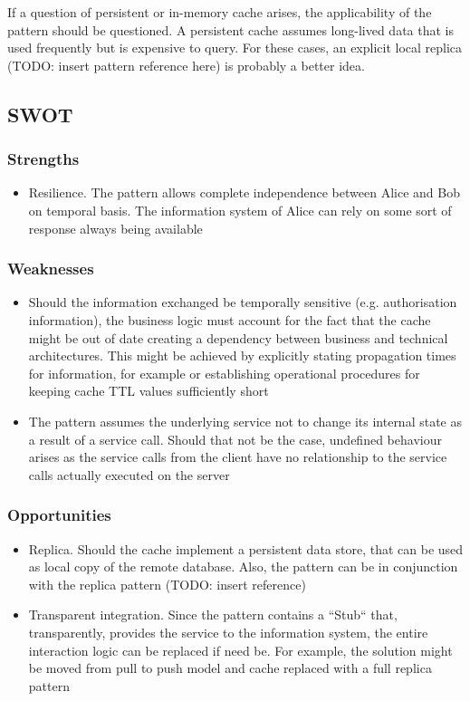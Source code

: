 \documentclass[10pt,a4paper]{article}
\begin{document}
If a question of persistent or in-memory cache arises, the applicability of the pattern should be questioned. A persistent cache assumes long-lived data that is used frequently but is expensive to query. For these cases, an explicit local replica (TODO: insert pattern reference here) is probably a better idea.

\subsection{SWOT}
\subsubsection{Strengths}
	\begin{itemize}
 		\item Resilience. The pattern allows complete independence between Alice and Bob on temporal basis. The information system of Alice can rely on some sort of response always being available  
	\end{itemize}
	
\subsubsection{Weaknesses}	
	 	\begin{itemize}
			\item Should the information exchanged be temporally sensitive (e.g. authorisation information), the business logic must account for the fact that the cache might be out of date creating a dependency between business and technical architectures. This might be achieved by explicitly stating propagation times for information, for example or establishing operational procedures for keeping cache TTL values sufficiently short 
			\item The pattern assumes the underlying service not to change its internal state as a result of a service call. Should that not be the case, undefined behaviour arises as the service calls from the client have no relationship to the service calls actually executed on the server
		\end{itemize}

\subsubsection{Opportunities}	
	 	\begin{itemize}
			\item Replica. Should the cache implement a persistent data store, that can be used as local copy of the remote database. Also, the pattern can be in conjunction with the replica pattern (TODO: insert reference)
			\item Transparent integration. Since the pattern contains a ``Stub`` that, transparently, provides the service to the information system, the entire interaction logic can be replaced if need be. For example, the solution might be moved from pull to push model and cache replaced with a full replica pattern
		\end{itemize}
		
\end{document}
